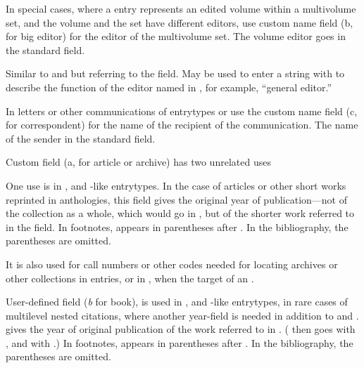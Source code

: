 \documentclass{ltxdockit}[2010/02/12]
\begin{document}
\begin{fieldlist}


In special cases, where a  entry represents an edited volume within a multivolume set, and the volume and the set have different editors, use custom name field  (b, for big editor)  for the editor of the multivolume set. The volume editor goes in the standard  field.


Similar to  and  but referring to the field. May be used to enter a string with to describe the function of the editor named in , for example, ``general editor.''


In letters or other communications of entrytypes  or  use the custom name field  (c, for correspondent) for the name of the recipient of the communication. The name of the sender in the standard  field.


Custom field  (a, for article or archive) has two unrelated uses

One use is in ,  and -like entrytypes. In the case of articles or other short works reprinted in anthologies, this field gives the original year of publication---not of the collection as a whole, which would go in , but of the shorter work referred to in the  field. In footnotes,  appears in parentheses after . In the bibliography, the parentheses are omitted.

It is also used for call numbers or other codes needed for locating archives or other collections in  entries, or in , when the target of an .


User-defined field  (\emph{b} for book), is used in ,  and -like entrytypes, in rare cases of multilevel nested citations, where another year-field is needed in addition to  and .  gives the year of original publication of the work referred to in . ( then goes with , and  with .) In footnotes,  appears in parentheses after . In the bibliography, the parentheses are omitted.




\end{fieldlist}
\end{document}
